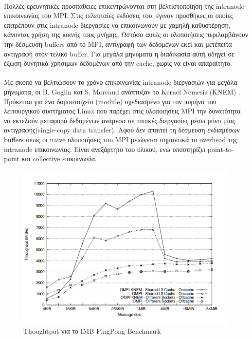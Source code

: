 \paragraph{}
Πολλές ερευνητικές προσπάθειες επικεντρώνονται στη βελτιστοποίηση της intranode επικοινωνίας του MPI. Στις τελευταίες εκδόσεις του, έγιναν προσθήκες οι οποίες επιτρέπουν στις intranode διεργασίες να επικοινωνούν με χαμηλή καθυστέρηση, κάνοντας χρήση της κοινής τους μνήμης. Ωστόσο αυτές οι υλοποιήσεις περιλαμβάνουν την δέσμευση buffers από το MPI, αντιγραφή των δεδομένων εκεί και μετέπειτα αντιγραφή στον τελικό buffer. Για μεγάλα μηνύματα η διαδικασία αυτή οδηγεί σε έξωση δυνητικά χρήσιμων δεδομένων από την cache, χωρίς να είναι απαραίτητο.

 \paragraph{}
Με σκοπό να βελτιώσουν το χρόνο επικοινωνίας intranode διεργασιών για μεγάλα μήνυματα, οι B. Goglin και S. Moreaud ανάπτυξαν το Kernel Nemesis (KNEM) \cite{KNEM}. Πρόκειται για ένα δομοστοιχείο (module) σχεδιασμένο για τον πυρήνα του λειτουργικού συστήματος Linux που παρέχει στις υλοποιήσεις MPI την δυνατότητα να εκτελούν μεταφορά δεδομένων ανάμεσα σε τοπικές διεργασίες μέσω μόνο μίας αντιγραφής(single-copy data transfer). Αφού δεν απαιτεί τη δέσμευση ενδιαμέσων buffers όπως οι naive υλοποιήσεις του MPI μειώνεται σημαντικά το overhead της intranode επικοινωνίας. Είναι ανεξάρτητο του υλικού, ενώ υποστηρίζει point-to-point και collective επικοινωνία. 
\begin{figure}[h]
    \centering
    \includegraphics[width=\textwidth]{./images/knem_graph.png}
    \caption{Thoughtput για το IMB PingPong Benchmark}
    \label{fig:Knem}
\end{figure}
